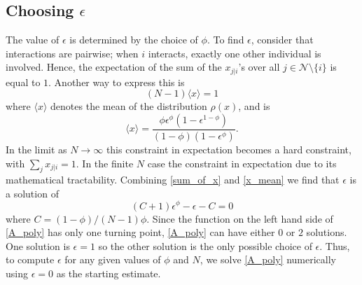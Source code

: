 \documentclass[twocolumn,8pt]{article}
\begin{document}
\subsection{Choosing $\epsilon$}
\label{epsilon}
The value of $\epsilon$ is determined by the choice of $\phi$. To find $\epsilon$, consider that interactions are pairwise; when $i$ interacts, exactly one other individual is involved. Hence, the expectation of the sum of the $x_{j|i}$'s over all $j\in \mathcal{N}\setminus\{i\}$ is equal to $1$. Another way to express this is
\begin{equation}
\label{sum_of_x}
(N-1) \langle x \rangle = 1
\end{equation}
where $\langle x \rangle$ denotes the mean of the distribution $\rho(x)$, and is
\begin{equation}
\label{x_mean}
\langle x \rangle=\frac{\phi\epsilon^{\phi}(1-\epsilon^{1-\phi})}{(1-\phi)(1-\epsilon^{\phi})}.
\end{equation}
In the limit as $N\rightarrow \infty$ this constraint in expectation becomes a hard constraint, with $\sum_{j} x_{j|i} =1$. In the finite $N$ case the constraint in expectation due to its mathematical tractability. Combining \eqref{sum_of_x} and \eqref{x_mean} we find that $\epsilon$ is a solution of
\begin{equation}
\label{A_poly}
(C+1)\epsilon^{\phi}-\epsilon-C=0
\end{equation}
where $C=(1-\phi)/(N-1)\phi$. Since the function on the left hand side of \eqref{A_poly} has only one turning point, \eqref{A_poly} can have either $0$ or $2$ solutions. One solution is $\epsilon=1$ so the other solution is the only possible choice of $\epsilon$. Thus, to compute $\epsilon$ for any given values of $\phi$ and $N$, we solve \eqref{A_poly} numerically using $\epsilon=0$ as the starting estimate.
\end{document}
